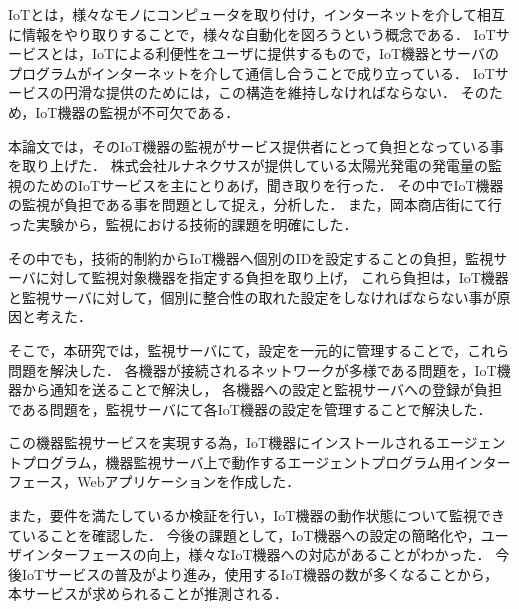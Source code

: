 IoTとは，様々なモノにコンピュータを取り付け，インターネットを介して相互に情報をやり取りすることで，様々な自動化を図ろうという概念である．
IoTサービスとは，IoTによる利便性をユーザに提供するもので，IoT機器とサーバのプログラムがインターネットを介して通信し合うことで成り立っている．
IoTサービスの円滑な提供のためには，この構造を維持しなければならない．
そのため，IoT機器の監視が不可欠である．
\medskip

本論文では，そのIoT機器の監視がサービス提供者にとって負担となっている事を取り上げた．
株式会社ルナネクサスが提供している太陽光発電の発電量の監視のためのIoTサービスを主にとりあげ，聞き取りを行った．
その中でIoT機器の監視が負担である事を問題として捉え，分析した．
また，岡本商店街にて行った実験から，監視における技術的課題を明確にした．

その中でも，技術的制約からIoT機器へ個別のIDを設定することの負担，監視サーバに対して監視対象機器を指定する負担を取り上げ，
これら負担は，IoT機器と監視サーバに対して，個別に整合性の取れた設定をしなければならない事が原因と考えた．


\begin{comment}
IoT機器の監視には，次のような技術的課題があることが分かった．
\begin{itemize}
\item ネットワークの監視はIoTサービスが提供する機能とは別の機能である事
\item IoT機器の接続されるネットワークは想定できない事
\item IoT機器の接続されるネットワークがプライベートアドレスである場合が多い事
\item IoT機器は大量に利用される為，サーバへ設定することが負担となること
\end{itemize}
\medskip

そこで，本研究では，IoT機器から通知を送ることで，IoT機器が接続されるネットワークによらない機器の監視を実現し，IoTサービスとは別個の機器監視サービスとして開発することで，提供者の負担を軽減することを提案した．
既存手法では何が足りないのか議論し，IoTサービスの実践やサービス提供者への聞き取りを通して，サービスに必要な要件を抽出し，設計を行った．
\end{comment}

そこで，本研究では，監視サーバにて，設定を一元的に管理することで，これら問題を解決した．
各機器が接続されるネットワークが多様である問題を，IoT機器から通知を送ることで解決し，
各機器への設定と監視サーバへの登録が負担である問題を，監視サーバにて各IoT機器の設定を管理することで解決した．

この機器監視サービスを実現する為，IoT機器にインストールされるエージェントプログラム，機器監視サーバ上で動作するエージェントプログラム用インターフェース，Webアプリケーションを作成した．
\medskip

また，要件を満たしているか検証を行い，IoT機器の動作状態について監視できていることを確認した．
今後の課題として，IoT機器への設定の簡略化や，ユーザインターフェースの向上，様々なIoT機器への対応があることがわかった．
今後IoTサービスの普及がより進み，使用するIoT機器の数が多くなることから，本サービスが求められることが推測される．

